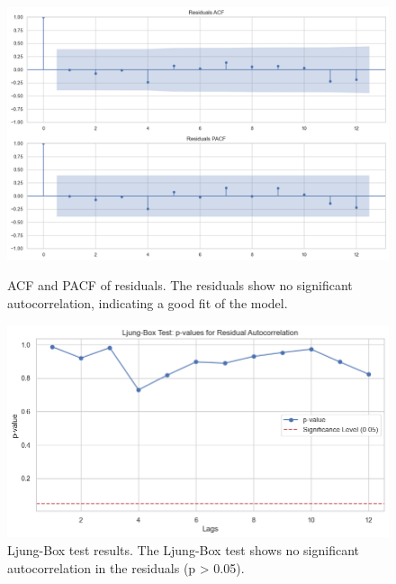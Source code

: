 \documentclass{mcmthesis}  %
\begin{document}
\begin{figure}[H]
  \centering
  \captionsetup{font=footnotesize} %
  \begin{minipage}[b]{0.21\textwidth}
    \includegraphics[width=\textwidth]{first_medal/5}
    \caption{ACF and PACF of residuals. The residuals show no significant autocorrelation, indicating a good fit of the model.}
    \label{fig:image-a}
  \end{minipage}
  \hfill
  \begin{minipage}[b]{0.21\textwidth}
    \includegraphics[width=\textwidth]{first_medal/8}
    \caption{Ljung-Box test results. The Ljung-Box test shows no significant autocorrelation in the residuals (p > 0.05).}
    \label{fig:image-a}
  \end{minipage}
  \hspace{0.05\textwidth} %
  \begin{minipage}[b]{0.21\textwidth}

\end{minipage}
\end{figure}
\end{document}
